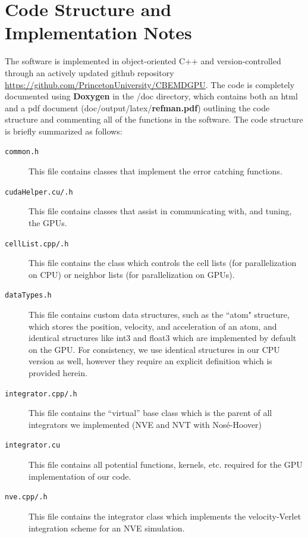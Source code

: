 \documentclass[12pt]{article}
\begin{document}
\section{Code Structure and Implementation Notes}

The software is implemented in object-oriented C++ and version-controlled through an actively updated github repository \url{https://github.com/PrincetonUniversity/CBEMDGPU}. The code is completely documented using \textbf{Doxygen} in the /doc directory, which contains both an html and a pdf document (doc/output/latex/\textbf{refman.pdf}) outlining the code structure and commenting all of the functions in the software.
%
The code structure is briefly summarized as follows:
\begin{description}

\item[\texttt{common.h}] This file contains classes that implement the error catching functions.

\item[\texttt{cudaHelper.cu/.h}] This file contains classes that assist in communicating with, and tuning, the GPUs.

\item[\texttt{cellList.cpp/.h}] This file contains the class which controls the cell lists (for parallelization on CPU) or neighbor lists (for parallelization on GPUs).

\item[\texttt{dataTypes.h}] This file contains custom data structures, such as the ``atom" structure, which stores the position, velocity, and acceleration of an atom, and identical structures like int3 and float3 which are implemented by default on the GPU.  For consistency, we use identical structures in our CPU version as well, however they require an explicit definition which is provided herein.
	
\item[\texttt{integrator.cpp/.h}] This file contains the ``virtual'' base class which is the parent of all integrators we implemented (NVE and NVT with Nos\'{e}-Hoover)

\item[\texttt{integrator.cu}] This file contains all potential functions, kernels, etc. required for the GPU implementation of our code.

\item[\texttt{nve.cpp/.h}] This file contains the integrator class which implements the velocity-Verlet integration scheme for an NVE simulation.


\end{description}
\end{document}
